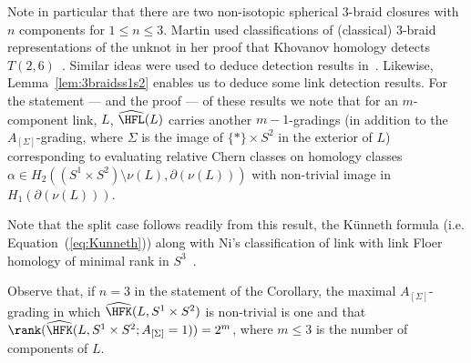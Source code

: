 \documentclass{amsart}
\theoremstyle{definition}
\theoremstyle{remark}
\numberwithin{equation}{section}
\begin{document}
Note in particular that there are two non-isotopic spherical $3$-braid closures with $n$ components for ${1\leq n\leq 3}$. 
Martin used classifications of (classical) $3$-braid  representations of the unknot in her proof that Khovanov homology detects $T(2,6)$~\cite{martin2022khovanov}. Similar ideas were used to deduce detection results in~\cite{binns2020knot,binns2024closures}. Likewise, Lemma~\ref{lem:3braidss1s2} enables us to deduce some link detection results. For the statement --- and the proof --- of these results we note that for an $m$-component link, $L$, $\widehat{\HFL}(L)$ carries another $m-1$-gradings (in addition to the $A_{[\Sigma]}$-grading, where $\Sigma$ is the image of $\{*\}\times S^2$ in the exterior of $L$) corresponding to evaluating relative Chern classes on homology classes $\alpha\in H_2((S^1\times S^2)\setminus \nu(L),\partial (\nu(L)))$ with non-trivial image in $H_1(\partial (\nu(L)))$.

\sphericalthreebraids

Note that the split case follows readily from this result, the K\"unneth formula (i.e. Equation~(\ref{eq:Kunneth})) along with  Ni's classification of link with link Floer homology of minimal rank in $S^3$~\cite[Proposition 1.4]{ni2014homological}.

Observe that, if $n=3$ in the statement of the Corollary, the maximal $A_{[\Sigma]}$-grading in which ${\widehat{\HFK}(L,S^1\times S^2)}$ is non-trivial is one and that ${\rank(\widehat{\HFK}(L,S^1\times S^2;A_{[\Sigma]}=1))=2^{{m}}}$, where $m\leq 3$ is the number of components of $L$.
\end{document}
